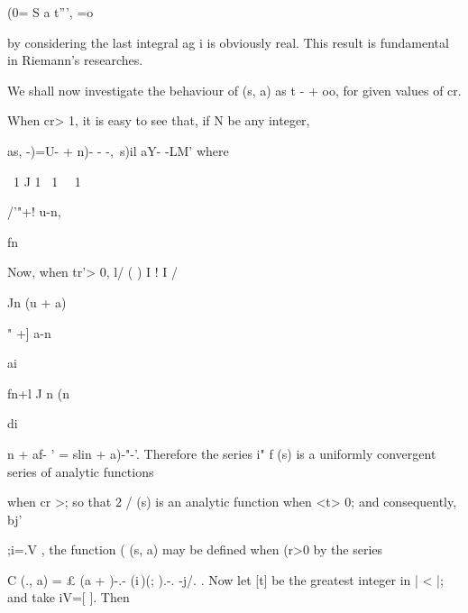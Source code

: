  (0= S a t''', =o

by considering the last integral ag i is obviously real. This result
is fundamental in Riemann's researches.


We shall now investigate the behaviour of (s, a) as t - + oo, for
given values of cr.

When cr> 1, it is easy to see that, if N be any integer,

as, -)=U- + n)- - -,\ s)il aY- -LM' where

\ 1 J 1 \ 1 \ \ 1

/'"+! u-n,

fn

Now, when tr'> 0, l/ ( ) I ! I /

Jn (u + a)

" +] a-n

ai

fn+l J n (n

di

 n + af- ' = slin + a)-"-'. Therefore the series i" f (s) is a
uniformly convergent series of analytic functions

when cr >; so that 2 / (s) is an analytic function when <t> 0; and
consequently, bj'

;i=.V
, the function ( (s, a) may be defined when (r>0 by the series

C (., a) = £ (a + )-.- (i\,)(; ).-. -j/. . Now let [t] be the
greatest integer in | < |; and take iV=[ ]. Then

